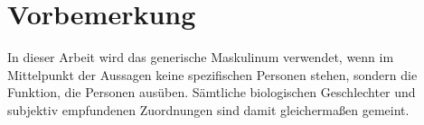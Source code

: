 \chapter*{Vorbemerkung}
\label{chap:vorbemerkung}

In dieser Arbeit wird das generische Maskulinum verwendet, wenn im Mittelpunkt der Aussagen keine spezifischen Personen stehen, sondern die Funktion, die Personen ausüben. Sämtliche biologischen Geschlechter und subjektiv empfundenen Zuordnungen sind damit gleichermaßen gemeint.
